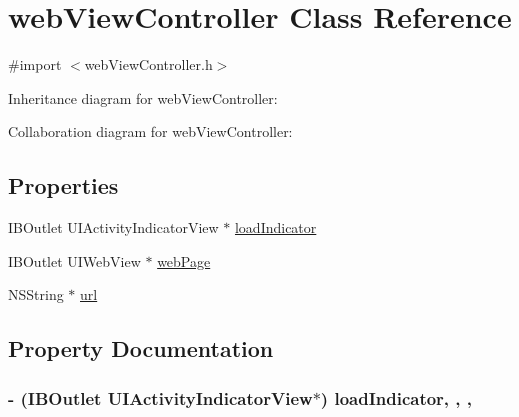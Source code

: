 \hypertarget{interfaceweb_view_controller}{}\section{web\+View\+Controller Class Reference}
\label{interfaceweb_view_controller}


{\ttfamily \#import $<$web\+View\+Controller.\+h$>$}



Inheritance diagram for web\+View\+Controller\+:


Collaboration diagram for web\+View\+Controller\+:
\subsection*{Properties}
\begin{DoxyCompactItemize}
\item 
I\+B\+Outlet U\+I\+Activity\+Indicator\+View $\ast$ \hyperlink{interfaceweb_view_controller_aed50ed21f737cd77446aca759e3ab5a7}{load\+Indicator}
\item 
I\+B\+Outlet U\+I\+Web\+View $\ast$ \hyperlink{interfaceweb_view_controller_a0a973d91b25a215ef7df7b9e5e6ad860}{web\+Page}
\item 
N\+S\+String $\ast$ \hyperlink{interfaceweb_view_controller_a6b63e34b44fea86498e7c602ee3700a9}{url}
\end{DoxyCompactItemize}


\subsection{Property Documentation}
\hypertarget{interfaceweb_view_controller_aed50ed21f737cd77446aca759e3ab5a7}{}
\subsubsection[{load\+Indicator}]{\setlength{\rightskip}{0pt plus 5cm}-\/ (I\+B\+Outlet U\+I\+Activity\+Indicator\+View$\ast$) load\+Indicator\hspace{0.3cm}{\ttfamily [read]}, {\ttfamily [write]}, {\ttfamily [nonatomic]}, {\ttfamily [weak]}}\label{interfaceweb_view_controller_aed50ed21f737cd77446aca759e3ab5a7}
\hypertarget{interfaceweb_view_controller_a6b63e34b44fea86498e7c602ee3700a9}{}
